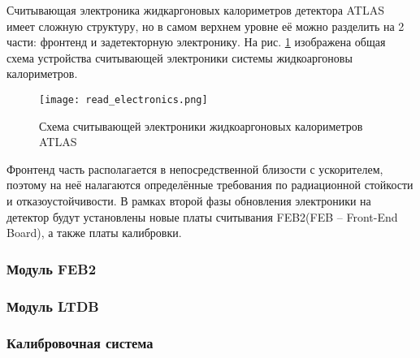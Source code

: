 Считывающая электроника жидкаргоновых калориметров детектора ATLAS имеет сложную структуру, но в самом верхнем уровне её можно разделить на 2 части: фронтенд и задетекторную электронику. На рис. \ref{fig:read_electronics} изображена общая схема устройства считывающей электроники системы жидкоаргоновы калориметров.
\begin{figure}[ht]
    \centering
    \texttt{[image: read\_electronics.png]}
    \caption{Схема считывающей электроники жидкоаргоновых калориметров ATLAS}
    \label{fig:read_electronics}
\end{figure}\par
Фронтенд часть располагается в непосредственной близости с ускорителем, поэтому на неё налагаются определённые требования по радиационной стойкости и отказоустойчивости. В рамках второй фазы обновления электроники на детектор будут установлены новые платы считывания FEB2(FEB -- Front-End Board), а также платы калибровки.\par

\subsubsection{Модуль FEB2}


\subsubsection{Модуль LTDB}


\subsubsection{Калибровочная система}


